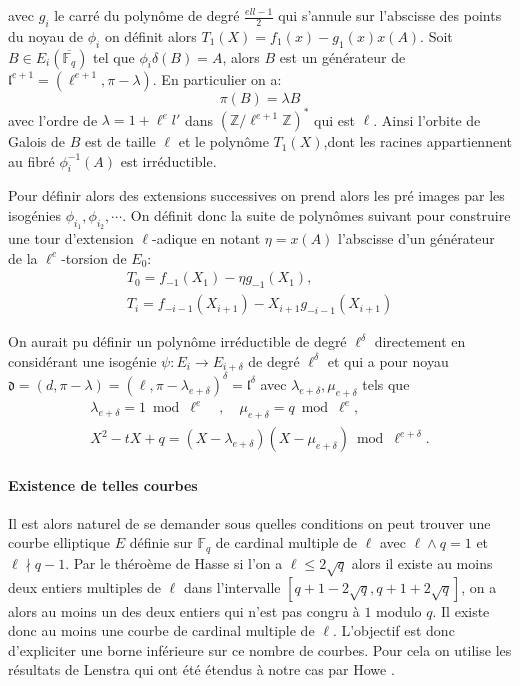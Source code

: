 \documentclass[10pt,a4paper]{book}
\theoremstyle{plain}
\theoremstyle{definition}
\theoremstyle{definition}
\theoremstyle{definition}
\theoremstyle{definition}
\theoremstyle{remark}
\theoremstyle{remark}
\begin{document}
avec $g_i$ le carré du polynôme de degré $\frac{ell-1}{2}$  qui s'annule sur l'abscisse des points du noyau de $\phi_{i}$ on  définit alors $ T_{1}(X)=f_{1}(x)-g_{1}(x)x(A)$. Soit $B \in E_i(\overline{\mathbb{F}_q})$ tel que $\phi_i{\delta}(B)=A$, alors  $B$ est un générateur de $\mathfrak{l}^{e+1}=(\ell^{e+1},\pi-\lambda)$. En particulier on a:
\begin{equation*}
\pi(B)=\lambda B
\end{equation*}
avec l'ordre de $\lambda=1+\ell^el'$ dans $(\mathbb{Z}/\ell^{e+1}\mathbb{Z})^*$ qui est $\ell$. Ainsi l'orbite de Galois de $B$ est de taille $\ell$ et le polynôme $T_{1}(X)$,dont les racines appartiennent au fibré $\phi_i^{-1}(A)$ est irréductible. 

Pour définir alors des extensions successives on prend alors les pré images par les isogénies $\phi_{i_1},\phi_{i_2}, \cdots$. On définit donc la suite de polynômes suivant pour construire une tour d'extension $\ell$-adique en notant $\eta =x(A)$ l'abscisse d'un générateur de la $\ell^e$-torsion de $E_0$:
\begin{align*}
T_0=f_{-1}(X_1)-\eta g_{-1}(X_1), \\
T_i=f_{-i-1}(X_{i+1})-X_{i+1}g_{-i-1}(X_{i+1})
\end{align*}

On aurait pu définir un polynôme irréductible de degré $\ell^{\delta}$ directement en considérant une isogénie $\psi:E_i \to E_{i+\delta}$ de degré $\ell^{\delta}$ et qui a pour noyau $\mathfrak{d}=(d,\pi-\lambda)=(\ell,\pi-\lambda_{e+\delta})^{\delta}=\mathfrak{l}^{\delta}$ avec $\lambda_{e+\delta}, \mu_{e+\delta}$ tels que 
\begin{align*}
\lambda_{e+\delta}=1 \bmod \ell^{e} \quad , \quad \mu_{e+\delta}=q \bmod \ell^e, \\
X^2-tX+q = (X-\lambda_{e+\delta})(X-\mu_{e+\delta}) \bmod \ell^{e+\delta} .
\end{align*}

\paragraph{Existence de telles courbes}
Il est alors naturel de se demander sous quelles conditions on peut trouver une courbe elliptique $E$ définie sur $\mathbb{F}_q$ de cardinal multiple de $\ell$ avec $\ell \wedge q =1$ et $\ell \nmid q-1$. Par le théroème de Hasse si l'on a $\ell \leqslant 2\sqrt{q}$ alors il existe au moins deux entiers multiples de $\ell$ dans l'intervalle $[q+1-2\sqrt{q}, q+1+2\sqrt{q} ] $, on a alors au moins un des deux entiers qui n'est pas congru à $1$ modulo $q$. Il existe donc au moins une courbe de cardinal multiple de $\ell$. L'objectif est donc d'expliciter une borne inférieure sur ce nombre de courbes. Pour cela on utilise les résultats de Lenstra \cite{lenstra1987} qui ont été étendus à notre cas par Howe \cite{howe1993}.
\end{document}
